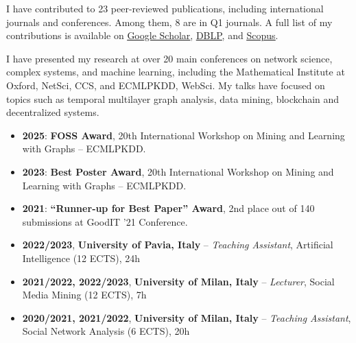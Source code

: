 \documentclass[11pt, a4paper]{awesome-cv}
\begin{document}
\begin{refsection}



I have contributed to 23 peer-reviewed publications, including international journals and conferences. Among them, 8 are in Q1 journals. A full list of my contributions is available on \underline{\href{https://scholar.google.com/citations?user=xRpvJ78AAAAJ&hl=it}{Google Scholar}}, \underline{\href{https://dblp.uni-trier.de/pid/247/1543.html}{DBLP}}, and \underline{\href{https://www.scopus.com/authid/detail.uri?authorId=57210572544}{Scopus}}.  


I have presented my research at over 20 main conferences on network science, complex systems, and machine learning, including the Mathematical Institute at Oxford, NetSci, CCS, and ECMLPKDD, WebSci. My talks have focused on topics such as temporal multilayer graph analysis, data mining, blockchain and decentralized systems.



\begin{itemize}
    \item \textbf{2025}: \textbf{FOSS Award}, 20th International Workshop on Mining and Learning with Graphs – ECMLPKDD.
    \item \textbf{2023}: \textbf{Best Poster Award}, 20th International Workshop on Mining and Learning with Graphs – ECMLPKDD.
    \item \textbf{2021}: \textbf{“Runner‑up for Best Paper” Award}, 2nd place out of 140 submissions at GoodIT ’21 Conference.
\end{itemize}



\begin{itemize}
    \item \textbf{2022/2023}, \textbf{University of Pavia, Italy} – \textit{Teaching Assistant}, Artificial Intelligence (12 ECTS), 24h  
    \item \textbf{2021/2022, 2022/2023}, \textbf{University of Milan, Italy} – \textit{Lecturer}, Social Media Mining (12 ECTS), 7h  
    \item \textbf{2020/2021, 2021/2022}, \textbf{University of Milan, Italy} – \textit{Teaching Assistant}, Social Network Analysis (6 ECTS), 20h  
\end{itemize}


\end{refsection}
\end{document}
